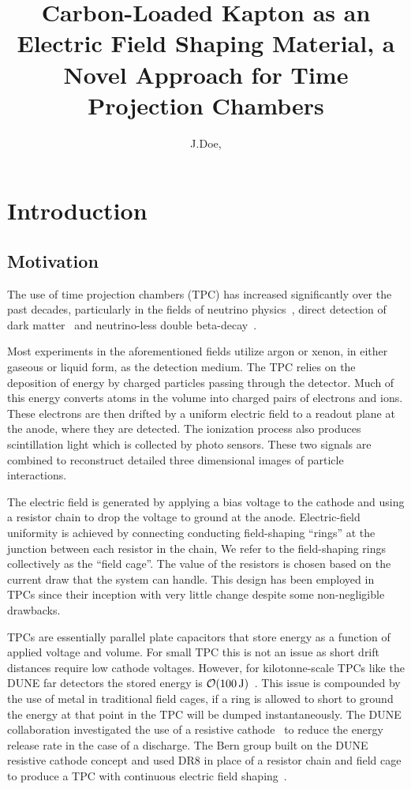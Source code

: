 \documentclass[a4paper,12pt]{article}
\title{Carbon-Loaded Kapton as an Electric Field Shaping Material, a Novel Approach for Time Projection Chambers}
\author[a,1]{J.Doe,\note{Corresponding author}}
\affiliation[a]{SLAC National Accelerator Laboratory,\\ Sand Hill Rd. Menlo Park, Ca, 94025, USA}
\affiliation[b]{Michigan State University,\\ 426 Auditorium Rd. East Lansing, Mi, 48824, USA}
\newcommand{\DR}{DR8}
\begin{document}
\listoftodos
\maketitle




\section{Introduction}
\label{sec:intro}
\subsection{Motivation}
The use of time projection chambers (TPC) has increased significantly over the past decades, particularly in the fields of neutrino physics~\cite{Acciarri:2016ooe,Adams:2019bzt,Amerio:2004ze}, direct detection of dark matter~\cite{Aprile:2012zx,Akerib:2019fml,Aalseth:2017fik} and neutrino-less double beta-decay~\cite{Pocar:2020zqz}. 

Most experiments in the aforementioned fields utilize argon or xenon, in either gaseous or liquid form, as the detection medium. 
The TPC relies on the deposition of energy by charged particles passing through the detector. 
Much of this energy converts atoms in the volume into charged pairs of electrons and ions. 
These electrons are then drifted by a uniform electric field to a readout plane at the anode, where they are detected. 
The ionization process also produces scintillation light which is collected by photo sensors. 
These two signals are combined to reconstruct detailed three dimensional images of particle interactions.

The electric field is generated by applying a bias voltage to the cathode and using a resistor chain to drop the voltage to ground at the anode.  
Electric-field uniformity is achieved by connecting conducting field-shaping ``rings'' at the junction between each resistor in the chain, We refer to the field-shaping rings collectively as the ``field cage''. 
The value of the resistors is chosen based on the current draw that the system can handle.
This design has been employed in TPCs since their inception with very little change despite some non-negligible drawbacks. 

TPCs are essentially parallel plate capacitors that store energy as a function of applied voltage and volume. 
For small TPC this is not an issue as short drift distances require low cathode voltages.
However, for kilotonne-scale TPCs like the DUNE far detectors the stored energy is $\order{\SI{100}{\joule}}$~\cite{Acciarri:2016ooe}.
This issue is compounded by the use of metal in traditional field cages, if a ring is allowed to short to ground the energy at that point in the TPC will be dumped instantaneously. 
The DUNE collaboration investigated the use of a resistive cathode~\cite{DUNE:2017pqt} to reduce the energy release rate in the case of a discharge.
The Bern group built on the DUNE resistive cathode concept and used {\DR} in place of a resistor chain and field cage to produce a TPC with continuous electric field shaping~\cite{bern_lartpc}.   
\end{document}
